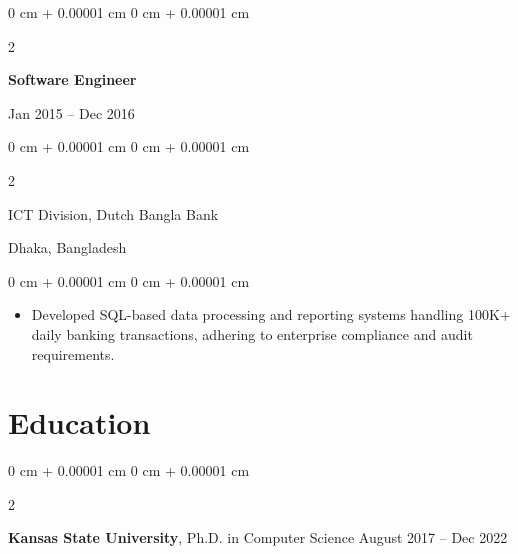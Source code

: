 \documentclass[10pt, letterpaper]{article}
\newenvironment{highlights}{
    \begin{itemize}[
        topsep=0.10 cm,
        parsep=0.10 cm,
        partopsep=0pt,
        itemsep=0pt,
        leftmargin=0 cm + 10pt
    ]
}{
    \end{itemize}
} %
\newenvironment{onecolentry}{
    \begin{adjustwidth}{
        0 cm + 0.00001 cm
    }{
        0 cm + 0.00001 cm
    }
}{
    \end{adjustwidth}
} %
\newenvironment{twocolentry}[2][]{
    \onecolentry
    \def\secondColumn{#2}
    \setcolumnwidth{\fill, 4.5 cm}
    \begin{paracol}{2}
}{
    \switchcolumn \raggedleft \secondColumn
    \end{paracol}
    \endonecolentry
} %
\begin{document}
    \vspace{0.1 cm}
    \begin{twocolentry}{Jan 2015 -- Dec 2016}
        \textbf{Software Engineer}
    \end{twocolentry}
    \begin{twocolentry}{Dhaka, Bangladesh}
       ICT Division, Dutch Bangla Bank
    \end{twocolentry}
    
    \begin{onecolentry}
        \begin{highlights}
            \item Developed SQL-based data processing and reporting systems handling 100K+ daily banking transactions, adhering to enterprise compliance and audit requirements.
        \end{highlights}
    \end{onecolentry}
    

\vspace{-1.5mm}
\section{Education}
    
        \begin{twocolentry}{
            August 2017 – Dec 2022
        }
            \textbf{Kansas State University}, Ph.D. in Computer Science\end{twocolentry}

\end{document}
